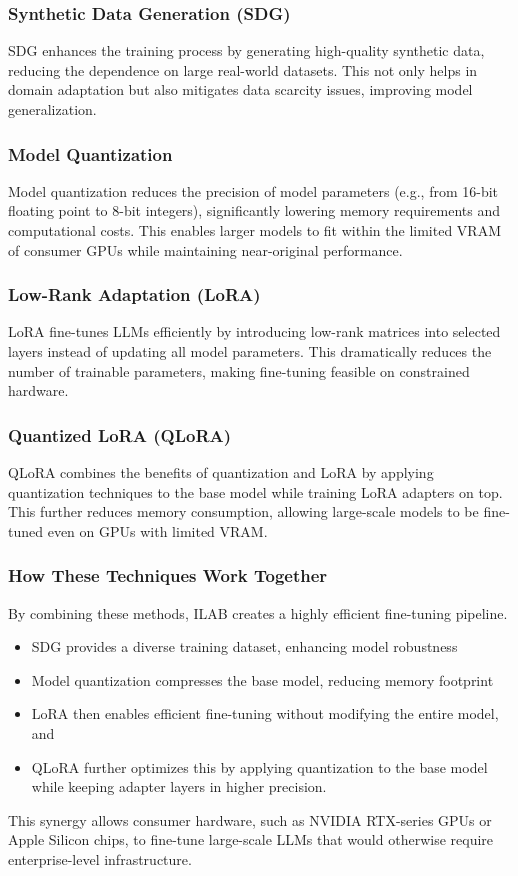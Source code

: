 \documentclass[12pt]{article}
\begin{document}
\subsubsection{Synthetic Data Generation (SDG)}
SDG enhances the training process by generating high-quality synthetic data, reducing the dependence on large real-world datasets. This not only helps in domain adaptation but also mitigates data scarcity issues, improving model generalization.

\subsubsection{Model Quantization}
Model quantization reduces the precision of model parameters (e.g., from 16-bit floating point to 8-bit integers), significantly lowering memory requirements and computational costs. This enables larger models to fit within the limited VRAM of consumer GPUs while maintaining near-original performance.

\subsubsection{Low-Rank Adaptation (LoRA)}
LoRA fine-tunes LLMs efficiently by introducing low-rank matrices into selected layers instead of updating all model parameters. This dramatically reduces the number of trainable parameters, making fine-tuning feasible on constrained hardware.

\subsubsection{Quantized LoRA (QLoRA)}
QLoRA combines the benefits of quantization and LoRA by applying quantization techniques to the base model while training LoRA adapters on top. This further reduces memory consumption, allowing large-scale models to be fine-tuned even on GPUs with limited VRAM.

\subsubsection{How These Techniques Work Together}
By combining these methods, ILAB creates a highly efficient fine-tuning pipeline.
\begin{itemize}
    \item SDG provides a diverse training dataset, enhancing model robustness
    \item Model quantization compresses the base model, reducing memory footprint
    \item LoRA then enables efficient fine-tuning without modifying the entire model, and
    \item QLoRA further optimizes this by applying quantization to the base model while keeping adapter layers in higher precision.
\end{itemize}
This synergy allows consumer hardware, such as NVIDIA RTX-series GPUs or Apple Silicon chips, to fine-tune large-scale LLMs that would otherwise require enterprise-level infrastructure.
\end{document}
